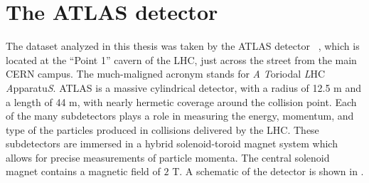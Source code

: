 

\chapter[The ATLAS detector][Top of Page Title]{The ATLAS detector} \label{Chapter-ATLAS}

The dataset analyzed in this thesis was taken by the ATLAS detector ~\cite{PERF-2007-01}, which is located at the ``Point 1'' cavern of the LHC, just across the street from the main CERN campus.
The much-maligned acronym stands for \textit{A} \textit{T}oriodal \textit{L}HC \textit{A}pparatu\textit{S}.
ATLAS is a massive cylindrical detector, with a radius of 12.5 m and a length of 44 m, with nearly hermetic coverage around the collision point.
Each of the many subdetectors plays a role in  measuring the energy, momentum, and type of the particles produced in collisions delivered by the LHC.
These subdetectors are immersed in a hybrid solenoid-toroid magnet system which allows for precise measurements of particle momenta.
The central solenoid magnet contains a magnetic field of $2$ T.
A schematic of the detector is shown in .

